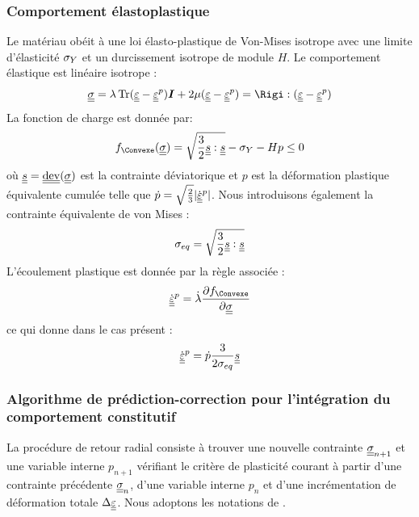 \documentclass[10pt]{book}
\begin{document}
\begin{appendices}
\subsubsection{Comportement élastoplastique}
Le matériau obéit à une loi élasto-plastique de Von-Mises isotrope avec une limite d'élasticité $\sigma_{Y}$ et un durcissement isotrope de module $H$. Le comportement élastique est linéaire isotrope :
$$\SC = \lambda \tr(\DefoHPP-\EpsP)\bI + 2\mu(\DefoHPP-\EpsP) = \Rigi:(\DefoHPP-\EpsP)$$
La fonction de charge est donnée par:
$$\FChargeConvexe(\SC) = \sqrt{\frac{3}{2}\devia:\devia} - \sigY -Hp \leq 0$$
où $\devia = \dev(\SC)$ est la contrainte déviatorique et $p$ est la déformation plastique équivalente cumulée telle que $\dot{p} = \sqrt{\frac{2}{3}}|\dot{\underline{\underline{\varepsilon}}}^{p}|$. Nous introduisons également la contrainte équivalente de von Mises :
$$\sigma_{eq} =  \sqrt{\frac{3}{2}\underline{\underline{s}}:\underline{\underline{s}}}$$
L'écoulement plastique est donnée par la règle associée :
$$\dot{\DefoHPP}^{p} = \dot{\lambda}\dfrac{\partial\FChargeConvexe}{\partial \SC}$$
ce qui donne dans le cas présent :
\begin{equation}
\dot{\underline{\underline{\varepsilon}}}^{p} = \dot{p}\dfrac{3}{2\sigma_{eq}}\underline{\underline{s}}
\label{eq:flow-rule}
\end{equation}
\subsubsection{Algorithme de prédiction-correction pour l'intégration du comportement constitutif}
La procédure de retour radial consiste à trouver une nouvelle contrainte $\underline{\underline{\sigma}}_{n+1}$ et une variable interne $p_{n+1}$ vérifiant le critère de plasticité courant à partir d'une contrainte précédente $\underline{\underline{\sigma}}_{n}$, d'une variable interne $p_n$ et d'une incrémentation de déformation totale $\Delta \underline{\underline{\varepsilon}}$. Nous adoptons les notations de \cite{bonnet2014finite}.


\end{appendices}
\end{document}
